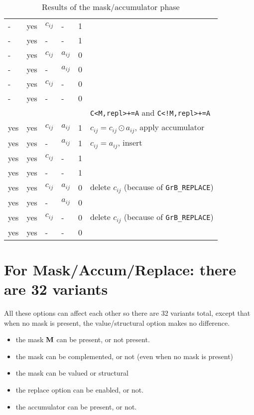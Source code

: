 \documentclass[11pt]{article}
\begin{document}
\begin{table}
{\begin{tabular}{lllll|l}
    -  &yes & $c_{ij}$ &  -        & 1    &   \\
    -  &yes &  -       &  -        & 1    &   \\
\hline
    -  &yes & $c_{ij}$ & $a_{ij}$  & 0    &   \\
    -  &yes &  -       & $a_{ij}$  & 0    &   \\
    -  &yes & $c_{ij}$ &  -        & 0    &   \\
    -  &yes &  -       &  -        & 0    &   \\
\hline
\hline
       &    &          &           &      & \verb'C<M,repl>+=A' and \verb'C<!M,repl>+=A' \\
\hline
    yes&yes & $c_{ij}$ & $a_{ij}$  & 1    &  $c_{ij} = c_{ij} \odot a_{ij}$, apply accumulator \\
    yes&yes &  -       & $a_{ij}$  & 1    &  $c_{ij} = a_{ij}$, insert \\
    yes&yes & $c_{ij}$ &  -        & 1    &   \\
    yes&yes &  -       &  -        & 1    &   \\
\hline

\hline
    yes&yes & $c_{ij}$ & $a_{ij}$  & 0    &  delete $c_{ij}$  (because of \verb'GrB_REPLACE') \\
    yes&yes &  -       & $a_{ij}$  & 0    &   \\
    yes&yes & $c_{ij}$ &  -        & 0    &  delete $c_{ij}$  (because of \verb'GrB_REPLACE') \\
    yes&yes &  -       &  -        & 0    &   \\
\hline
\end{tabular}
}
\caption{Results of the mask/accumulator phase \label{tab:maskaccum}}
\end{table}

\newpage
\section{For Mask/Accum/Replace: there are 32 variants}

All these options can affect each other so there are 32 variants total,
except that when no mask is present, the value/structural option makes
no difference.

\begin{itemize}
\item the mask ${\bf M}$ can be present, or not present.
\item the mask can be complemented, or not (even when no mask is present)
\item the mask can be valued or structural
\item the replace option can be enabled, or not.
\item the accumulator can be present, or not.
\end{itemize}
\end{document}
